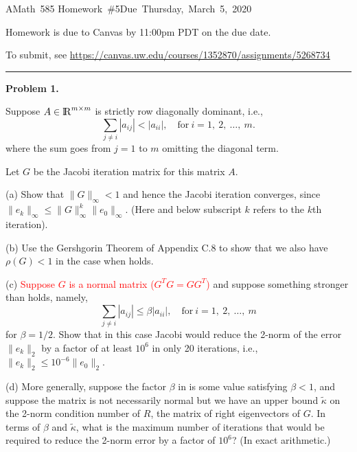 \documentclass[10pt]{article}
\begin{document}
\hfill\vbox{\hbox{AMath 585}
\hbox{Homework \#5}\hbox{Due Thursday, March 5, 2020}}

\vskip 5pt

Homework is due to Canvas by 11:00pm PDT on the due date.

To submit, see
\url{https://canvas.uw.edu/courses/1352870/assignments/5268734}


\vskip 1cm
\hrule
{\bf Problem 1.}

Suppose $A \in {{\rm l} \kern -.15em {\rm R} }^{m\times m}$ is strictly row diagonally dominant,
i.e.,
\begin{equation}\label{diagdom}
\sum_{j\neq i} |a_{ij}| < |a_{ii}|, \quad\text{for}~i=1,~2,~\ldots,~m.
\end{equation} 
where the sum goes from $j=1$ to $m$ omitting the diagonal term.

Let $G$ be the Jacobi iteration matrix for this matrix $A$.

(a) Show that $\|G\|_\infty < 1$ and hence the Jacobi iteration converges,
since $\|e_k\|_\infty \leq \|G\|_\infty^k \|e_0\|_\infty$.  (Here and below
subscript $k$ refers to the $k$th iteration).

(b) Use the Gershgorin Theorem of Appendix C.8 to show that we also have
$\rho(G) < 1$ in the case when  holds.

(c) \textcolor{red}{Suppose $G$ is a normal matrix ($G^TG = GG^T$)}
and suppose something
stronger than  holds, namely,
\begin{equation}\label{diagdom2}
\sum_{j\neq i} |a_{ij}| \leq \beta |a_{ii}|, \quad\text{for}~i=1,~2,~\ldots,~m
\end{equation} 
for $\beta = 1/2$.
Show that in this case Jacobi would reduce the 2-norm of the error
$\|e_k\|_2$ by a factor of at least $10^6$ in only 20 iterations, i.e., 
$\|e_k\|_2 \leq 10^{-6}\|e_0\|_2.$


(d) More generally, suppose the factor $\beta$ in 
is some value satisfying $\beta < 1$, and suppose the matrix is not
necessarily normal but we have an upper bound $\tilde \kappa$ on
the 2-norm condition number of $R$, the matrix of right eigenvectors
of $G$.  In terms of $\beta$ and $\tilde \kappa$, what is the maximum
number of iterations that would be required to reduce the 2-norm
error by a factor of $10^6$?  (In exact arithmetic.)

\end{document}
